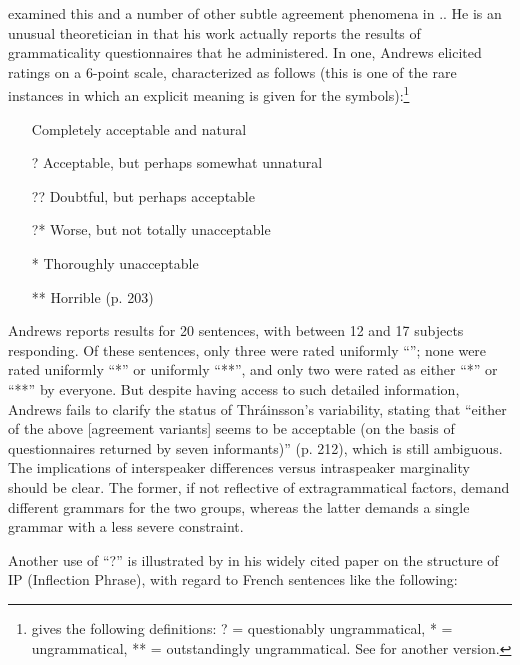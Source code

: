 \citet{Andrews1990} examined this and a number of other subtle agreement phenomena in .. He is an unusual theoretician in that his work actually reports the results of grammaticality questionnaires that he administered. In one, Andrews elicited ratings on a 6-point scale, characterized as follows (this is one of the rare instances in which an explicit meaning is given for the symbols):\footnote{\citet{Labov1972b} gives the following definitions: ? = questionably ungrammatical, * = ungrammatical, ** = outstandingly ungrammatical. See \citet{Householder1973} for another version.}

\begin{itemize}
 \item[{\checkmark}] Completely acceptable and natural
 \item[?] Acceptable, but perhaps somewhat unnatural
 \item[??]  Doubtful, but perhaps acceptable
 \item[?*] Worse, but not totally unacceptable
 \item[*] Thoroughly unacceptable
 \item[**] Horrible (p. 203)
\end{itemize}

\noindent
Andrews reports results for 20 sentences, with between 12 and 17 subjects responding. Of these sentences, only three were rated uniformly ``{\checkmark}''; none were rated uniformly ``*'' or uniformly ``**'', and only two were rated as either ``*'' or
``**'' by everyone. But despite having access to such detailed information, Andrews fails to clarify the status of Thráinsson's variability, stating that ``either of the above [agreement variants] seems to be acceptable (on the basis of questionnaires returned by seven informants)'' (p. 212), which is still ambiguous. The implications of interspeaker differences versus intraspeaker marginality should be clear. The former, if not reflective of extragrammatical factors, demand different grammars for the two groups, whereas the latter demands a single grammar with a less severe constraint.

Another use of ``?'' is illustrated by \citet{Pollock1989}
in his widely cited paper on the structure of IP (Inflection Phrase), with regard to French sentences like the following:

\label{ex:2:10}\z

